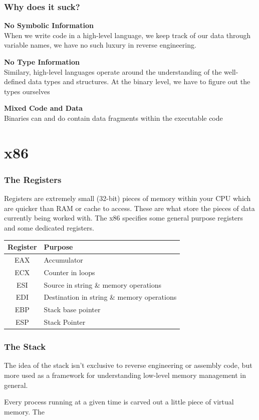 \documentclass{beamer}
\begin{document}
	\begin{frame}
		\frametitle{Why does it suck?}
		
		\textbf{No Symbolic Information}\\
		When we write code in a high-level language, we keep track of our data through variable names, we have no such luxury in reverse engineering. 
		\newline
		
		\textbf{No Type Information}\\
		Similary, high-level languages operate around the understanding of the well-defined data types and structures. At the binary level, we have to figure out the types ourselves
		\newline
		
		\textbf{Mixed Code and Data}\\
		Binaries can and do contain data fragments within the executable code
	\end{frame}
		
	\section{x86}
	
	\begin{frame}
		\frametitle{The Registers}
		
		Registers are extremely small (32-bit) pieces of memory within your CPU which are quicker than RAM or cache to access. These are what store the pieces of data currently being worked with. The x86 specifies some general purpose registers and some dedicated registers. 
		\newline
		
		\begin{tabular}{|c|l|}
			\hline
			\textbf{Register} & \textbf{Purpose} \\
			\hline
			\hline
			EAX & Accumulator\\
			\hline
			ECX & Counter in loops\\
			\hline
			ESI & Source in string \& memory operations\\
			\hline
			EDI & Destination in string \& memory operations\\
			\hline
			EBP & Stack base pointer\\
			\hline
			ESP & Stack Pointer\\
			\hline
		\end{tabular}
	\end{frame}

	\begin{frame}
		\frametitle{The Stack}
		
		The idea of the stack isn't exclusive to reverse engineering or assembly code, but more used as a framework for understanding low-level memory management in general.
		\newline
		
		Every process running at a given time is carved out a little piece of virtual memory. The 		
	\end{frame}
\end{document}
